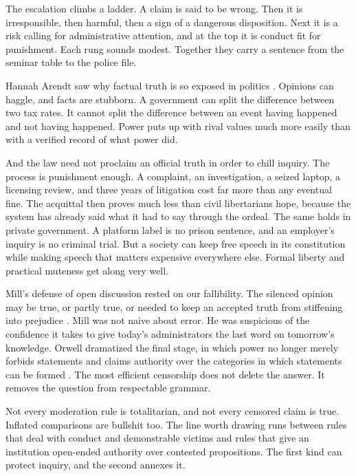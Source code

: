 \documentclass[12pt,a4paper]{book}
\begin{document}
The escalation climbs a ladder. A claim is said to be wrong. Then it is irresponsible, then harmful, then a sign of a dangerous disposition. Next it is a risk calling for administrative attention, and at the top it is conduct fit for punishment. Each rung sounds modest. Together they carry a sentence from the seminar table to the police file.

Hannah Arendt saw why factual truth is so exposed in politics \cite{Arendt-1967-truth}. Opinions can haggle, and facts are stubborn. A government can split the difference between two tax rates. It cannot split the difference between an event having happened and not having happened. Power puts up with rival values much more easily than with a verified record of what power did.

And the law need not proclaim an official truth in order to chill inquiry. The process is punishment enough. A complaint, an investigation, a seized laptop, a licensing review, and three years of litigation cost far more than any eventual fine. The acquittal then proves much less than civil libertarians hope, because the system has already said what it had to say through the ordeal. The same holds in private government. A platform label is no prison sentence, and an employer's inquiry is no criminal trial. But a society can keep free speech in its constitution while making speech that matters expensive everywhere else. Formal liberty and practical muteness get along very well.

Mill's defense of open discussion rested on our fallibility. The silenced opinion may be true, or partly true, or needed to keep an accepted truth from stiffening into prejudice \cite{Mill1859}. Mill was not naive about error. He was suspicious of the confidence it takes to give today's administrators the last word on tomorrow's knowledge. Orwell dramatized the final stage, in which power no longer merely forbids statements and claims authority over the categories in which statements can be formed \cite{Orwell-1984}. The most efficient censorship does not delete the answer. It removes the question from respectable grammar.

Not every moderation rule is totalitarian, and not every censored claim is true. Inflated comparisons are bullshit too. The line worth drawing runs between rules that deal with conduct and demonstrable victims and rules that give an institution open-ended authority over contested propositions. The first kind can protect inquiry, and the second annexes it.
\end{document}
